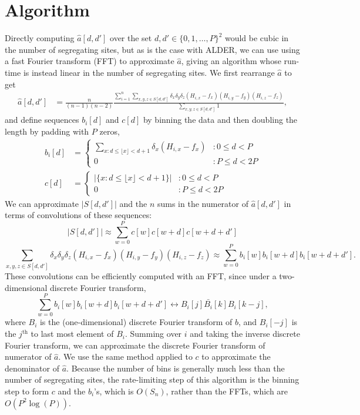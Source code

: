 \section{Algorithm}
Directly computing $\hat{a}[d,d']$ over the set $d,d'\in \{0,1,\dots,P\}^2$ would be cubic in the number of segregating sites, but as is the case with ALDER, we can use using a fast Fourier transform (FFT) to approximate $\hat{a}$, giving an algorithm whose run-time is instead linear in the number of segregating sites. We first rearrange $\hat{a}$ to get
\begin{align*}
	\hat{a}[d,d']
		&=\frac{n}{(n-1)(n-2)}
		\frac{\sum_{i=1}^n\sum_{x,y,z\in S[d,d']}
			\delta_x\delta_y\delta_z(H_{i,x}-f_x)(H_{i,y}-f_y)(H_{i,z}-f_z)}
		{\sum_{x,y,z\in S[d,d']}1},
\end{align*}
and define sequences $b_i[d]$ and $c[d]$ by binning the data and then doubling the length by padding with $P$ zeros,
\begin{align*}
	b_i[d] &= \left\{
     \begin{array}{ll}
       \sum_{x: d\leq \lfloor{x}\rfloor < d+1}\delta_x(H_{i,x}-f_x) & : 0\leq d < P\\
       0 & : P\leq d <2P
     \end{array}
   \right.\\
  	c[d] &= \left\{
     \begin{array}{ll}
       |\{x: d\leq \lfloor{x}\rfloor < d+1\}| & : 0\leq d < P\\
       0 & : P\leq d <2P
     \end{array}
   \right.
\end{align*}
We can approximate $|S[d,d']|$ and the $n$ sums in the numerator of $\hat{a}[d,d']$ in terms of convolutions of these sequences:
$$
	|S[d,d']| \approx \sum_{w=0}^P c[w]c[w+d]c[w+d+d']
$$
$$
	\sum_{x,y,z\in S[d,d']}\delta_x\delta_y\delta_z(H_{i,x}-f_x)(H_{i,y}-f_y)(H_{i,z}-f_z)
		\approx
	\sum_{w=0}^P b_i[w]b_i[w+d]b_i[w+d+d'].
$$
These convolutions can be efficiently computed with an FFT, since under a two-dimensional discrete Fourier transform, 
$$
	\sum_{w=0}^P b_i[w]b_i[w+d]b_i[w+d+d'] \leftrightarrow B_i[j]\bar{B_i}[k]B_i[k-j],
$$
where $B_i$ is the (one-dimensional) discrete Fourier transform of $b$, and $B_i[-j]$ is the $j^\text{th}$ to last most element of $B_i$. Summing over $i$ and taking the inverse discrete Fourier transform, we can approximate the discrete Fourier transform of numerator of  $\hat{a}$. We use the same method applied to $c$ to approximate the denominator of $\hat{a}$. Because the number of bins is generally much less than the number of segregating sites, the rate-limiting step of this algorithm is the binning step to form $c$ and the $b_i$'s, which is $O(S_n)$, rather than the FFTs, which are $O(P^2\log(P))$.

